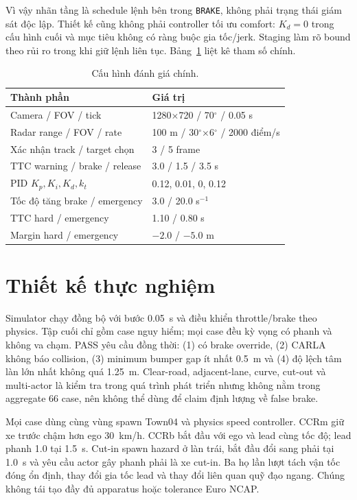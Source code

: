 \documentclass[conference]{IEEEtran}
\begin{document}
Vì vậy nhãn tầng là schedule lệnh bên trong \texttt{BRAKE}, không phải trạng thái
giám sát độc lập. Thiết kế cũng không phải controller tối ưu comfort: $K_d=0$
trong cấu hình cuối và mục tiêu không có ràng buộc gia tốc/jerk. Staging làm rõ
bound theo rủi ro trong khi giữ lệnh liên tục. Bảng~\ref{tab:config} liệt kê tham
số chính.

\begin{table}[t]
\caption{Cấu hình đánh giá chính.}
\label{tab:config}
\centering
\footnotesize
\begin{tabular}{p{}p{}}
\toprule
Thành phần & Giá trị \\
\midrule
Camera / FOV / tick & 1280$\times$720 / 70$^\circ$ / 0.05 s \\
Radar range / FOV / rate & 100 m / 30$^\circ$$\times$6$^\circ$ / 2000 điểm/s \\
Xác nhận track / target chọn & 3 / 5 frame \\
TTC warning / brake / release & 3.0 / 1.5 / 3.5 s \\
PID $K_p,K_i,K_d,k_t$ & 0.12, 0.01, 0, 0.12 \\
Tốc độ tăng brake / emergency & 3.0 / 20.0 s$^{-1}$ \\
TTC hard / emergency & 1.10 / 0.80 s \\
Margin hard / emergency & $-2.0$ / $-5.0$ m \\
\bottomrule
\end{tabular}
\end{table}

\section{Thiết kế thực nghiệm}
Simulator chạy đồng bộ với bước 0.05~s và điều khiển throttle/brake theo physics.
Tập cuối chỉ gồm case nguy hiểm; mọi case đều kỳ vọng có phanh và không va chạm.
PASS yêu cầu đồng thời: (1) có brake override, (2) CARLA không báo collision,
(3) minimum bumper gap ít nhất 0.5~m và (4) độ lệch tâm làn lớn nhất không quá
1.25~m. Clear-road, adjacent-lane, curve, cut-out và multi-actor là kiểm tra
trong quá trình phát triển nhưng không nằm trong aggregate 66 case, nên không
thể dùng để claim định lượng về false brake.

Mọi case dùng cùng vùng spawn Town04 và physics speed controller. CCRm giữ xe
trước chậm hơn ego 30~km/h. CCRb bắt đầu với ego và lead cùng tốc độ; lead phanh
1.0 tại 1.5~s. Cut-in spawn hazard ở làn trái, bắt đầu đổi sang phải tại 1.0~s và
yêu cầu actor gây phanh phải là xe cut-in. Ba họ lần lượt tách vận tốc đóng ổn
định, thay đổi gia tốc lead và thay đổi liên quan quỹ đạo ngang. Chúng không tái
tạo đầy đủ apparatus hoặc tolerance Euro NCAP.
\end{document}

